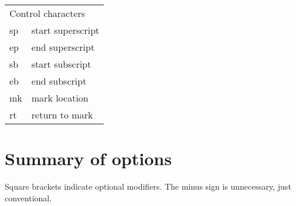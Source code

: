 \begin{tabular}{ll}
\multicolumn{2}{l}{Control characters} \\
sp & start superscript \\
ep & end superscript \\
sb & start subscript \\
eb & end subscript \\
mk & mark location \\
rt & return to mark 
\end{tabular}

\newpage
\section{Summary of options}
Square brackets indicate optional modifiers.  The minus sign is
unnecessary, just conventional.
\par\vspace{1.0\baselineskip}
\par
